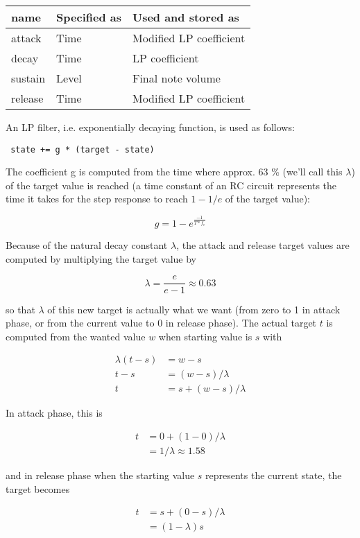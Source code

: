 \documentclass[10pt,a4paper,oneside]{article}
\begin{document}
\begin{tabular}{l l l}
	name	&	Specified as&	Used and stored as\\
	\hline
	attack	&	Time		&	Modified LP coefficient\\
	decay	&	Time		&	LP coefficient\\
	sustain	&	Level		&	Final note volume\\
	release	&	Time		&	Modified LP coefficient
\end{tabular}

An LP filter, i.e. exponentially decaying function, is used as follows:

\begin{verbatim}
 state += g * (target - state)
\end{verbatim}

The coefficient g is computed from the time where approx. 63 \% (we'll call this $\lambda$) of the target value is reached (a time constant of an RC circuit represents the time it takes for the step response to reach $1-1/e$ of the target value):

\[
 g = 1 - e^{\frac{-1}{T * f_c}}
\]

Because of the natural decay constant $\lambda$, the attack and release target values are computed by multiplying the target value by

\[
 \lambda = \frac{e}{e-1} \approx 0.63
\]

so that $\lambda$ of this new target is actually what we want (from zero to 1 in attack phase, or from the current value to 0 in release phase). The actual target $t$ is computed from the wanted value $w$ when starting value is $s$ with

\[
\begin{split}
 \lambda (t - s) &= w - s\\
 t - s &= (w - s) / \lambda\\
 t &= s + (w - s) / \lambda
\end{split}
\]

In attack phase, this is

\[
\begin{split}
 t &= 0 + (1 - 0) / \lambda\\
   &= 1 / \lambda \approx 1.58
\end{split}
\]

and in release phase when the starting value $s$ represents the current state, the target becomes

\[
\begin{split}
 t &= s + (0 - s) / \lambda\\
   &= (1 - \lambda) s
\end{split}
\]
\end{document}
